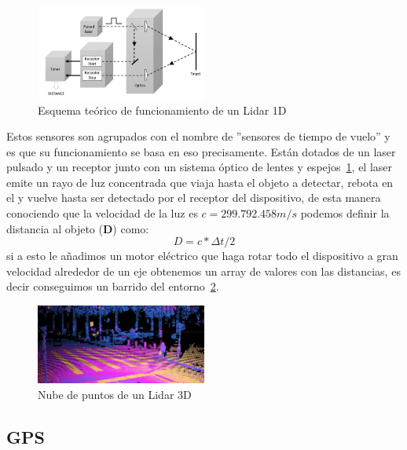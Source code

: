 \begin{figure}[H]
    \centering
    \includegraphics[width=0.5\textwidth]{images/lidar_explicacion.png}
    \caption{Esquema teórico de funcionamiento de un Lidar 1D}
    \label{fig:lidar_explicacion}
\end{figure}

Estos sensores son agrupados con el nombre de ''sensores de tiempo de vuelo'' y es que su funcionamiento se basa en eso precisamente. Están 
dotados de un laser pulsado y un receptor junto con un sistema óptico de lentes y espejos~\ref{fig:lidar_explicacion}, el laser emite un rayo de luz concentrada que viaja 
hasta el objeto a detectar, rebota en el y vuelve hasta ser detectado por el receptor del dispositivo, de esta manera conociendo que la 
velocidad de la luz es \begin{math}c=299.792.458 m/s\end{math} podemos definir la distancia al objeto (\textbf{D}) como:~$$D = c * \Delta{t} / 2$$ si a esto 
le añadimos un motor eléctrico que haga rotar todo el dispositivo a gran velocidad alrededor de un eje obtenemos un array de valores con 
las distancias, es decir conseguimos un barrido del entorno~\ref{fig:lidar3d}.


\begin{figure}[h]
    \centering
    \includegraphics[width=0.5\textwidth]{images/Pointcloud-from-Ouster-lidar-Copyright-C-Ouster-4.png}
    \caption{Nube de puntos de un Lidar 3D}
    \label{fig:lidar3d}
\end{figure}
\newpage

\subsection{GPS}

